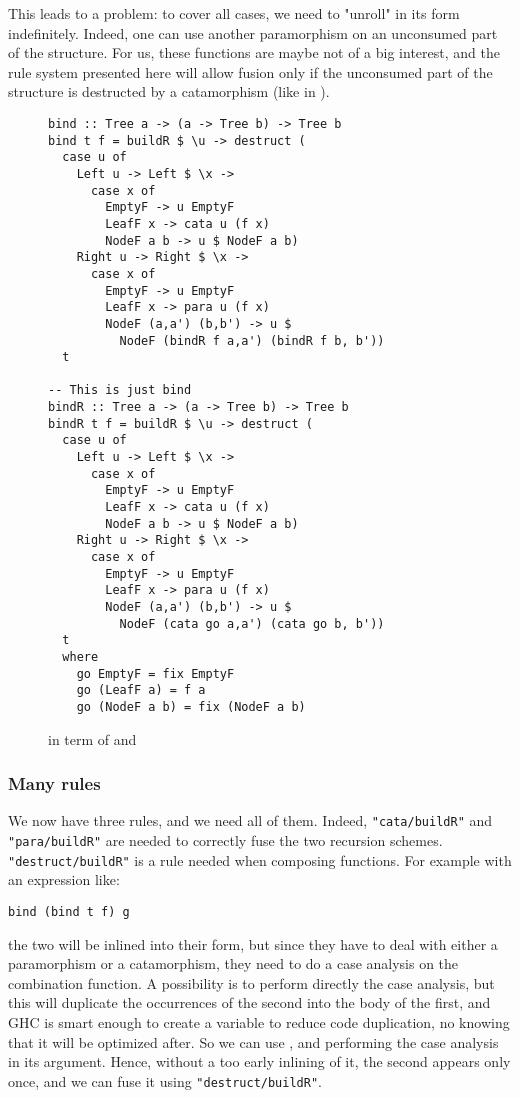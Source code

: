 This leads to a problem: to cover all cases, we need to "unroll"  in its  form indefinitely. Indeed, one can use another paramorphism on an unconsumed part of the structure. For us, these functions are maybe not of a big interest, and the rule system presented here will allow fusion only if the unconsumed part of the structure is destructed by a catamorphism (like in ).

\begin{figure}
\begin{verbatim}
bind :: Tree a -> (a -> Tree b) -> Tree b
bind t f = buildR $ \u -> destruct (
  case u of
    Left u -> Left $ \x ->
      case x of
        EmptyF -> u EmptyF
        LeafF x -> cata u (f x)
        NodeF a b -> u $ NodeF a b)
    Right u -> Right $ \x ->
      case x of
        EmptyF -> u EmptyF
        LeafF x -> para u (f x)
        NodeF (a,a') (b,b') -> u $
          NodeF (bindR f a,a') (bindR f b, b'))
  t

-- This is just bind
bindR :: Tree a -> (a -> Tree b) -> Tree b
bindR t f = buildR $ \u -> destruct (
  case u of
    Left u -> Left $ \x ->
      case x of
        EmptyF -> u EmptyF
        LeafF x -> cata u (f x)
        NodeF a b -> u $ NodeF a b)
    Right u -> Right $ \x ->
      case x of
        EmptyF -> u EmptyF
        LeafF x -> para u (f x)
        NodeF (a,a') (b,b') -> u $
          NodeF (cata go a,a') (cata go b, b'))
  t
  where
    go EmptyF = fix EmptyF
    go (LeafF a) = f a
    go (NodeF a b) = fix (NodeF a b)

\end{verbatim}
\caption{ in term of  and }
\label{fig:bindbuild}
\end{figure}

\subsubsection{Many rules}
We now have three rules, and we need all of them. Indeed, \verb|"cata/buildR"| and \verb|"para/buildR"| are needed to correctly fuse the two recursion schemes. \verb|"destruct/buildR"| is a rule needed when composing functions. For example with an expression like:
\begin{verbatim}
bind (bind t f) g
\end{verbatim}
\noindent the two  will be inlined into their  form, but since they have to deal with either a paramorphism or a catamorphism, they need to do a case analysis on the combination function. A possibility is to perform directly the case analysis, but this will duplicate the occurrences of the second  into the body of the first, and GHC is smart enough to create a variable to reduce code duplication, no knowing that it will be optimized after. So we can use , and performing the case analysis in its argument. Hence, without a too early inlining of it, the second  appears only once, and we can fuse it using \verb|"destruct/buildR"|.

